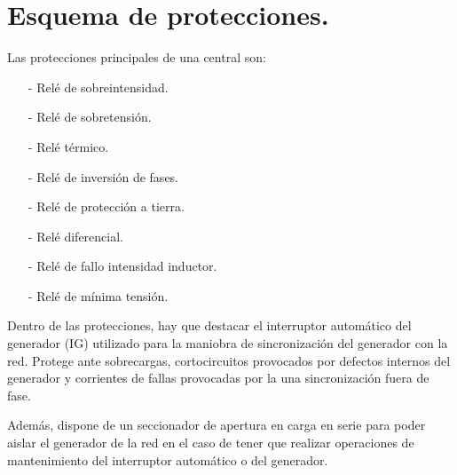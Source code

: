 \section{Esquema de protecciones.}
Las protecciones principales de una central son:
\begin{itemize}
	\item [-] Relé de sobreintensidad.
	\item [-] Relé de sobretensión.
	\item [-] Relé térmico.
	\item [-] Relé de inversión de fases.
	\item [-] Relé de protección a tierra.
	\item [-] Relé diferencial.
	\item [-] Relé de fallo intensidad
	inductor.
	\item [-] Relé de mínima tensión.
\end{itemize}

Dentro de las protecciones, hay que destacar el interruptor automático del generador (IG) utilizado para la maniobra de sincronización del generador con la red. Protege ante sobrecargas, cortocircuitos provocados por defectos internos del generador y corrientes
de fallas provocadas por la una sincronización fuera de fase.


Además, dispone de un seccionador de apertura en carga en serie para poder aislar el generador de la
red en el caso de tener que realizar operaciones de mantenimiento del interruptor automático o del
generador.

